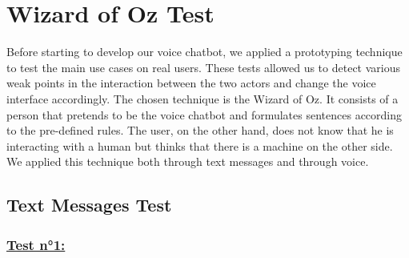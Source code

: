 \section{Wizard of Oz Test}

Before starting to develop our voice chatbot, we applied a prototyping technique to
test the main use cases on real users. These tests allowed us to detect
various weak points in the interaction between the two actors and change the
voice interface accordingly. The chosen technique is the Wizard of Oz. It consists
of a person that pretends to be the voice chatbot and formulates sentences according
to the pre-defined rules. The user, on the other hand, does not know that he is interacting
with a human but thinks that there is a machine on the other side. We applied this
technique both through text messages and through voice.

\subsection{Text Messages Test}

\subsubsection*{ \underline{Test n°1:} }

